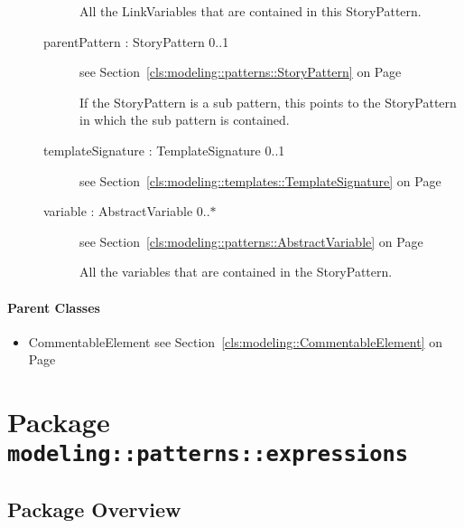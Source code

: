 \begin{description}
\begin{description}
	
			
All the LinkVariables that are contained in this StoryPattern.	
		
	
\item[parentPattern : StoryPattern 			\symbol{"5B}0..1\symbol{"5D}]
see Section~\ref{cls:modeling::patterns::StoryPattern} on Page~\pageref{cls:modeling::patterns::StoryPattern}
\hspace{\fill}
\nopagebreak


	
			
If the StoryPattern is a sub pattern, this points to the StoryPattern in which the sub pattern is contained.	
		
	
\item[templateSignature : TemplateSignature 			\symbol{"5B}0..1\symbol{"5D}]
see Section~\ref{cls:modeling::templates::TemplateSignature} on Page~\pageref{cls:modeling::templates::TemplateSignature}
\hspace{\fill}
\nopagebreak


	
\item[variable : AbstractVariable 			\symbol{"5B}0..$*$\symbol{"5D}]
see Section~\ref{cls:modeling::patterns::AbstractVariable} on Page~\pageref{cls:modeling::patterns::AbstractVariable}
\hspace{\fill}
\nopagebreak


	
			
All the variables that are contained in the StoryPattern.	
		
	
	\end{description}
	

\end{description}

\paragraph{Parent Classes}
\begin{itemize}
\item CommentableElement see Section~\ref{cls:modeling::CommentableElement} on Page~\pageref{cls:modeling::CommentableElement}\end{itemize}
\newpage
		


\section{Package \bfseries \texttt{modeling::patterns::expressions}\normalfont}
\subsection{Package Overview}
	
